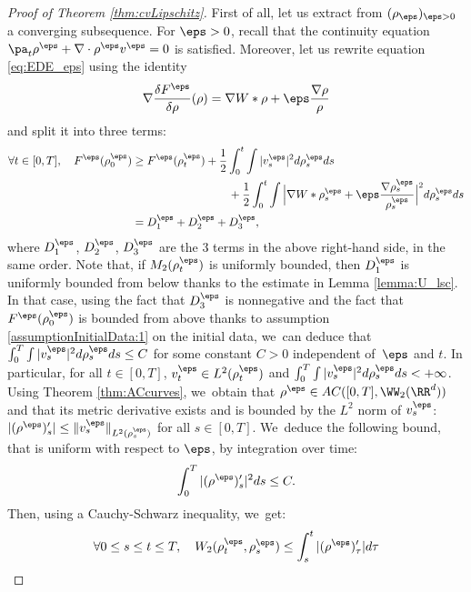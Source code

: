 \begin{proof}[Proof of Theorem \ref{thm:cvLipschitz}]
First of all, let us extract from $(\rho_\eps)_{\eps>0}$ a converging subsequence. For $\eps > 0$, recall that the continuity equation $\pa_t \rho^\eps + \nabla \cdot \rho^\eps v^\eps = 0$ is satisfied. Moreover, let us rewrite equation \eqref{eq:EDE_eps} using the identity
\[
\nabla \dfrac{\delta F^\eps}{\delta \rho}(\rho) = \nabla W * \rho + \eps \dfrac{\nabla \rho}{\rho}
\]
and split it into three terms:
\begin{equation}\label{eq:EDE_eps_split}
\begin{aligned}
\forall t \in [0,T], \quad F^\eps(\rho_0^\eps) &\geq F^\eps(\rho^\eps_t) + \frac 12 \int_0^t \int |v^\eps_s|^2 d\rho^\eps_s ds\\
&\hspace*{3cm}+ \frac 12 \int_0^t \int \Big| \nabla W * \rho^\eps_s + \eps \frac{\nabla \rho^\eps_s}{\rho^\eps_s} \Big|^2 d\rho^\eps_s ds \\
&= D_1^\eps + D_2^\eps + D_3^\eps,
\end{aligned}
\end{equation}
where $D_1^\eps$, $D_2^\eps$, $D_3^\eps$ are the 3 terms in the above right-hand side, in the same order.
Note that, if $M_2(\rho_t^\eps)$ is uniformly bounded, then $D_1^\eps$ is uniformly bounded from below thanks to the estimate in Lemma \ref{lemma:U_lsc}. In that case, using the fact that $D_3^\eps$ is nonnegative and the fact that $F^\eps(\rho_0^\eps)$ is bounded from above thanks to assumption \eqref{assumptionInitialData:1} on the initial data, we~can deduce that $\int_0^T \int |v^\eps_s|^2 d\rho^\eps_s ds \leq C$ for some constant $C>0$ independent of~$\eps$ and $t$. In particular, for all $t \in [0,T]$, $v_t^\eps \in L^2(\rho_t^\eps)$ and $\int_0^T \int |v^\eps_s|^2 d\rho^\eps_s ds < +\infty$. Using Theorem \ref{thm:ACcurves}, we~obtain that $\rho^\eps \in AC([0,T], \WW_2(\RR^d))$ and that its metric derivative exists and is bounded by the $L^2$ norm of $v^\eps_s$: $|(\rho^\eps)'_s| \leq \|v^\eps_s\|_{L^2(\rho^\eps_s)}$ for all $s \in [0,T]$. We~deduce the following bound, that is uniform with respect to $\eps$, by integration over time:
\[
\int_0^T |(\rho^\eps)'_s|^2 ds \leq C.
\]
Then, using a Cauchy-Schwarz inequality, we~get:
\begin{equation}\label{eq:rhoEpsHolder}
\begin{aligned}
\forall 0 \leq s \leq t \leq T, \quad W_2(\rho_t^\eps, \rho_s^\eps) &\leq \int_s^t |(\rho^\eps)'_\tau| d\tau \\

\end{aligned}
\end{equation}
\end{proof}
